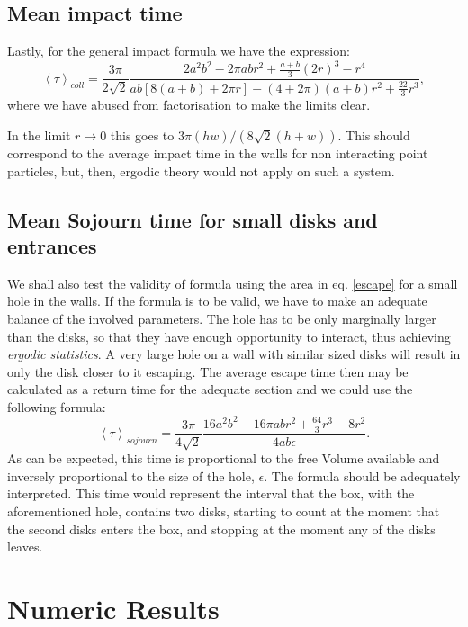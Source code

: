 \documentclass[a4paper,10pt, jcp, aps, preprint]{revtex4-1}
\newcommand{\mean}[1]{\left \langle #1 \right \rangle}
\begin{document}
\subsection{Mean impact time}

Lastly, for the general impact formula we have the expression:
\begin{equation}\label{impactwall}
 \mean{\tau}_{coll} = 	
\frac{3 \pi}{2\sqrt{2}}
\frac { 2a^{2} b^{2}  -  2\pi a b r^{2} + \frac{a+b}{3}(2r)^3 - r^4}
{ab[8(a+b)+2\pi r]- (4+2\pi)(a+b)r^2+\frac{22}{3} r^3},
\end{equation}
where we have abused from factorisation to make the limits clear.

In the limit $r\rightarrow 0$ this goes to $3 \pi (hw)/(8\sqrt{2}(h+w))$.
This should correspond to the average impact time in the walls
for non interacting point particles, 
but, then, ergodic theory would not apply
on such a system. 

\subsection{Mean Sojourn  time for small disks and entrances}

We shall also test the validity of formula using the area in eq. \ref{escape}
for a small hole in the walls. If the formula is to be valid, we have
to make an adequate balance of the involved parameters. The hole has to
be only marginally larger than the disks, so that they have enough opportunity
to interact, thus achieving \emph{ergodic statistics}. A very large hole
on a wall with similar sized disks will result in only the disk closer to
it escaping. The average escape time then may be calculated as
a return time for the adequate section and we could use the following formula:
\begin{equation} 
\mean{\tau}_{sojourn} = 	
\frac{3 \pi}{4\sqrt{2}}
\frac {16a^2b^2-16\pi a b r^2 + \frac{64}{3} r^3 - 8 r^2  }
{4 a b \epsilon}.
\end{equation}
As can be expected, this time is proportional to the
free Volume available and inversely proportional to the size of the hole, $\epsilon$.
The formula should be adequately interpreted. This time would represent
the interval that the box, with the aforementioned hole, contains two disks,
starting to count at the moment that the second disks enters the box, and
stopping at the moment any of the disks leaves. 


\section{Numeric Results}
\end{document}
